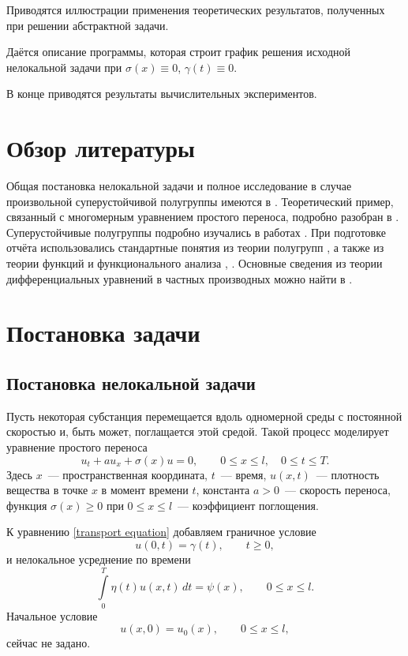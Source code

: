 \documentclass{article}
\renewcommand{\le}{\leqslant}
\renewcommand{\ge}{\geqslant}
\theoremstyle{definition}
\begin{document}
Приводятся иллюстрации применения теоретических результатов, полученных при решении абстрактной задачи.

Даётся описание программы, которая строит график решения исходной нелокальной задачи при 
$\sigma(x) \equiv 0$, $\gamma(t) \equiv 0$.

В конце приводятся результаты вычислительных экспериментов.

\newpage

\section{Обзор литературы}
Общая постановка нелокальной задачи и полное исследование
в случае произвольной суперустойчивой полугруппы имеются в \cite{Tikhonov1}.
Теоретический пример, связанный с многомерным уравнением простого переноса,
подробно разобран в \cite{Tikhonov2}.
Суперустойчивые полугруппы подробно изучались в работах \cite{Balakrishnan_1, Balakrishnan_2}.
При подготовке отчёта использовались стандартные понятия из теории полугрупп \cite{Dunford_Schwartz, Pazy},
а также из теории функций и функционального анализа \cite{Kolmogorov_Fomin}, \cite{Trenogin}.
Основные сведения из теории дифференциальных уравнений в частных производных можно найти в \cite{Filippov}.

\newpage

\section{Постановка задачи}

\subsection{Постановка нелокальной задачи}
Пусть некоторая субстанция перемещается вдоль одномерной среды с постоянной скоростью и, быть может, поглащается этой средой.
Такой процесс моделирует уравнение простого переноса
\begin{equation} \label{transport equation}
	u_t + au_x + \sigma(x)u = 0, \qquad 0 \le x \le l, \quad 0 \le t \le T.
\end{equation}
Здесь $x$~--- пространственная координата, $t$~--- время, $u(x,t)$~--- плотность вещества в точке $x$ в момент времени $t$, 
константа $ a > 0 $~--- скорость переноса, функция $ \sigma(x) \ge 0 $ при $ 0 \le x \le l $~--- коэффициент поглощения.

К уравнению \eqref{transport equation} добавляем граничное условие
\begin{equation} \label{boundary condition}
	u(0,t) = \gamma(t), \qquad t \ge 0,
\end{equation}
 и нелокальное усреднение по времени
\begin{equation} \label{integral averaging}
	\int\limits_{0}^{T} \eta(t) u(x, t)\,dt = \psi(x), 	\qquad 0 \le x \le l.
\end{equation}
Начальное условие 
\begin{equation*}
	u(x,0) = u_0(x), \qquad 0 \le x \le l,
\end{equation*}
сейчас не задано.
\end{document}
